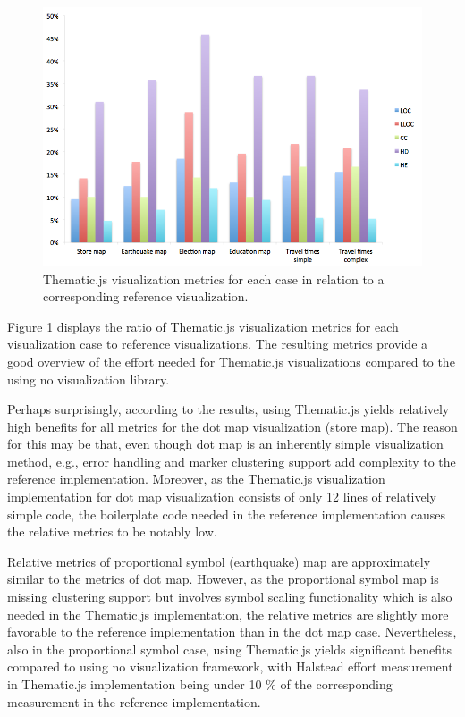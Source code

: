 \begin{figure}[htbp]
  \begin{center}
    \includegraphics[width=\textwidth]{images/evaluation-results.png}
    \caption{Thematic.js visualization metrics for each case in relation to a corresponding reference visualization. }
    \label{fig:evaluationchart}
  \end{center}
\end{figure}

Figure \ref{fig:evaluationchart} displays the ratio of Thematic.js visualization metrics for each visualization case to reference visualizations. The resulting metrics provide a good overview of the effort needed for Thematic.js visualizations compared to the using no visualization library.

Perhaps surprisingly, according to the results, using Thematic.js yields relatively high benefits for all metrics for the dot map visualization (store map). The reason for this may be that, even though dot map is an inherently simple visualization method, e.g., error handling and marker clustering support add complexity to the reference implementation. Moreover, as the Thematic.js visualization implementation for dot map visualization consists of only 12 lines of relatively simple code, the boilerplate code needed in the reference implementation causes the relative metrics to be notably low.

Relative metrics of proportional symbol (earthquake) map are approximately similar to the metrics of dot map. However, as the proportional symbol map is missing clustering support but involves symbol scaling functionality which is also needed in the Thematic.js implementation, the relative metrics are slightly more favorable to the reference implementation than in the dot map case. Nevertheless, also in the proportional symbol case, using Thematic.js yields significant benefits compared to using no visualization framework, with Halstead effort measurement in Thematic.js implementation being under 10 \% of the corresponding measurement in the reference implementation.

